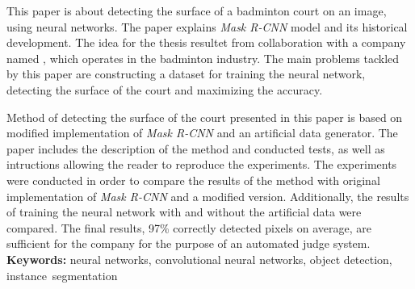 
This paper is about detecting the surface of a badminton court on an image, using neural networks.
The paper explains \textit{Mask R-CNN} model and its historical development.
The idea for the thesis resultet from collaboration with a company named \blue{}, which operates in the badminton industry.
The main problems tackled by this paper are constructing a dataset for training the neural network, detecting the surface of the court and maximizing the accuracy.

Method of detecting the surface of the court presented in this paper is based on modified implementation of \textit{Mask R-CNN} and an artificial data generator. The paper includes the description of the method and conducted tests, as well as intructions allowing the reader to reproduce the experiments. The experiments were conducted in order to compare the results of the method with original implementation of \textit{Mask R-CNN} and a modified version. Additionally, the results of training the neural network with and without the artificial data were compared. The final results, 97\% correctly detected pixels on average, are sufficient for the \blue{} company for the purpose of an automated judge system.
\\

\noindent \textbf{Keywords:} neural networks, convolutional neural networks, object detection, instance~segmentation
